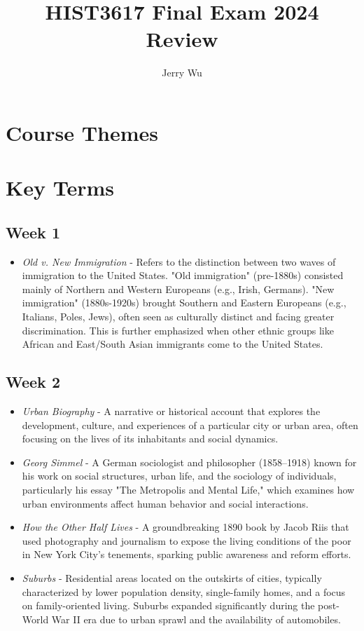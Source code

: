 \documentclass[12pt]{article}
\title{HIST3617 Final Exam 2024 Review}
\author{Jerry Wu}
\begin{document}
\maketitle

\section*{Course Themes}

\section*{Key Terms}

\subsection*{Week 1}

\begin{itemize}
    \item \textit{Old v. New Immigration} - Refers to the distinction between two waves of immigration to the United States. "Old immigration" (pre-1880s) consisted mainly of Northern and Western Europeans (e.g., Irish, Germans). "New immigration" (1880s-1920s) brought Southern and Eastern Europeans (e.g., Italians, Poles, Jews), often seen as culturally distinct and facing greater discrimination. This is further emphasized when other ethnic groups like African and East/South Asian immigrants come to the United States.
\end{itemize}

\subsection*{Week 2}

\begin{itemize}
    \item \textit{Urban Biography} - A narrative or historical account that explores the development, culture, and experiences of a particular city or urban area, often focusing on the lives of its inhabitants and social dynamics.
    
    \item \textit{Georg Simmel} - A German sociologist and philosopher (1858–1918) known for his work on social structures, urban life, and the sociology of individuals, particularly his essay "The Metropolis and Mental Life," which examines how urban environments affect human behavior and social interactions.
    
    \item \textit{How the Other Half Lives} - A groundbreaking 1890 book by Jacob Riis that used photography and journalism to expose the living conditions of the poor in New York City's tenements, sparking public awareness and reform efforts.
    
    \item \textit{Suburbs} - Residential areas located on the outskirts of cities, typically characterized by lower population density, single-family homes, and a focus on family-oriented living. Suburbs expanded significantly during the post-World War II era due to urban sprawl and the availability of automobiles.
\end{itemize}
\end{document}
